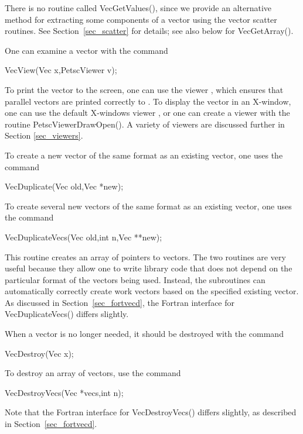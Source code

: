 There is no routine called VecGetValues(), since we provide 
an alternative method for extracting some components of a vector using
the vector scatter routines.  See Section~\ref{sec_scatter} for details; see also
below for VecGetArray().

One can examine a vector with the command 
\begin{tabbing}
  VecView(Vec x,PetscViewer v);
\end{tabbing}
To print the vector to the screen, one can use the viewer
 ,
which ensures that parallel vectors are printed correctly to
. To display the vector in an X-window, one can use the
default X-windows viewer ,
 or one can create a viewer with the
routine PetscViewerDrawOpen().  A variety of viewers are discussed
further in Section \ref{sec_viewers}.

To create a new vector of the same format as an existing vector, one uses
the command 
\begin{tabbing}
  VecDuplicate(Vec old,Vec *new);
\end{tabbing}
To create several new vectors of the same format as an existing vector,
one uses the command 
\begin{tabbing}
  VecDuplicateVecs(Vec old,int n,Vec **new);
\end{tabbing}
This routine creates an array of pointers to vectors. The two routines 
are very useful because they allow one to write library code that does 
not depend on the particular format of the vectors being used. Instead,
the subroutines can automatically correctly create work vectors
based on the specified existing vector.  As discussed in 
Section~\ref{sec_fortvecd}, the Fortran interface for VecDuplicateVecs()
differs slightly.

When a vector is no longer needed, it should be destroyed with the 
command 
\begin{tabbing}
  VecDestroy(Vec x);
\end{tabbing}
To destroy an array of vectors, use the command 
\begin{tabbing}
  VecDestroyVecs(Vec *vecs,int n);
\end{tabbing}
Note that the Fortran interface for VecDestroyVecs() differs slightly,
as described in Section~\ref{sec_fortvecd}.

